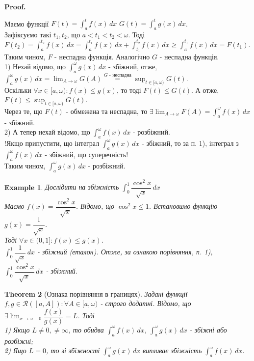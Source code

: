 \documentclass[a4paper, 10pt]{article}
\makeatletter
\def\huge{\displaystyle}
\def\qed{$\blacksquare$}
\theoremstyle{theoremdd}
\newtheorem{theorem}{Theorem}[subsection]
\theoremstyle{theoremdd}
\theoremstyle{theoremdd}
\theoremstyle{theoremdd}
\theoremstyle{theoremdd}
\newtheorem{example}[theorem]{Example}
\theoremstyle{theoremdd}
\theoremstyle{theoremdd}
\theoremstyle{theoremdd}
\theoremstyle{theoremdd}
\renewenvironment{proof}[1][Proof.\\]{\par
\pushQED{\hfill \qed}%
\normalfont \topsep6\p@\@plus6\p@\relax
\trivlist
\item\relax
{\bfseries
#1\@addpunct{.}}\hspace\labelsep\ignorespaces
}{%
\popQED\endtrivlist\@endpefalse
}
\makeatother
\begin{document}
\begin{proof}
Маємо функції $F(t) = \huge\int_a^t f(x)\,dx$ \hspace{0.5cm} $G(t) = \huge\int_a^t g(x)\,dx$.\\
Зафіксуємо такі $t_1,t_2$, що $a < t_1 < t_2 < \omega$. Тоді\\
$F(t_2) = \huge\int_a^{t_2} f(x)\,dx = \huge\int_a^{t_1} f(x)\,dx + \huge\int_{t_1}^{t_2} f(x)\,dx \geq \huge\int_a^{t_1} f(x)\,dx = F(t_1)$.\\
Таким чином, $F$ - неспадна функція. Аналогічно $G$ - неспадна функція.\\
1) Нехай відомо, що $\huge\int_a^\omega g(x)\,dx$ - збіжний, отже,\\
$\huge\int_a^\omega g(x)\,dx = \huge \lim_{A \to \omega} G(A) \overset{G\text{ - неспадна}}{=} \sup_{t \in [a,\omega)} G(t)$.\\
Оскільки $\forall x \in [a,\omega): f(x) \leq g(x)$, то тоді $F(t) \leq G(t)$. А отже, $F(t) \leq \huge \sup_{t \in [a,\omega)} G(t)$.\\
Через те, що $F(t)$ - обмежена та неспадна, то $\huge\exists \lim_{A \to \omega} F(A) = \int_a^\omega f(x)\,dx$ - збіжний.\\
2) А тепер нехай відомо, що $\huge\int_a^\omega f(x)\,dx$ - розбіжний.\\
!Якщо припустити, що інтеграл $\huge\int_a^\omega g(x)\,dx$ - збіжний, то за п. 1), інтеграл з $\huge\int_a^\omega f(x)\,dx$ - збіжний, що суперечність!\\
Таким чином, $\huge\int_a^\omega g(x)\,dx$ - розбіжний.
\end{proof}

\begin{example}
Дослідити на збіжність $\huge\int_0^1 \dfrac{\cos^2 x}{\sqrt{x}}\,dx$\\
Маємо $f(x) = \dfrac{\cos^2 x}{\sqrt{x}}$. Відомо, що $\cos^2 x \leq 1$. Встановимо функцію $g(x) = \dfrac{1}{\sqrt{x}}$.\\Тоді $\forall x \in (0,1]: f(x) \leq g(x)$.\\
$\huge\int_0^1 \dfrac{1}{\sqrt{x}}\,dx$ - збіжний (еталон). Отже, за ознакою порівняння, п. 1), $\huge\int_0^1 \dfrac{\cos^2 x}{\sqrt{x}}\,dx$ - збіжний.
\\
\end{example}

\begin{theorem}[Ознака порівняння в границях]
Задані функції $f,g \in \mathcal{R}([a,A]): \forall A \in [a,\omega)$ - строго додатні. Відомо, що $\exists \huge \lim_{x \to \omega-0} \dfrac{f(x)}{g(x)} = L$. Тоді\\
1) Якщо $L \neq 0, \neq \infty$, то обидва $\huge\int_a^\omega f(x)\,dx$, $\huge\int_a^\omega g(x)\,dx$ - збіжні або розбіжні;\\
2) Ящо $L = 0$, то зі збіжності $\huge\int_a^\omega g(x)\,dx$ випливає збіжність $\huge\int_a^\omega f(x)\,dx$.
\end{theorem}
\end{document}
